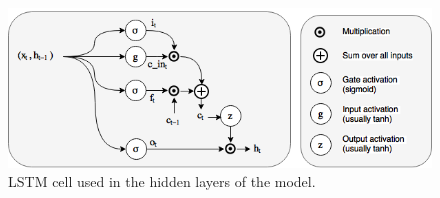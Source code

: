 


\begin{figure}[htb]
\centering
\includegraphics[width=1\columnwidth]{figures/lstm_block.png}
\caption{LSTM cell used in the hidden layers of the model.} 
\label{fig_lstmcell}
\end{figure}

